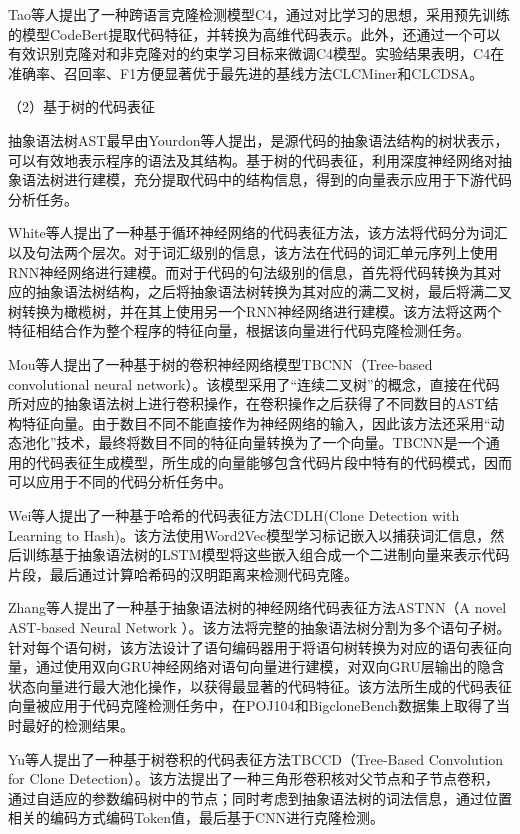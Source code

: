 Tao等人\cite{9796359}提出了一种跨语言克隆检测模型C4，通过对比学习的思想，采用预先训练的模型CodeBert提取代码特征，并转换为高维代码表示。此外，还通过一个可以有效识别克隆对和非克隆对的约束学习目标来微调C4模型。实验结果表明，C4在准确率、召回率、F1方便显著优于最先进的基线方法CLCMiner\cite{Cheng2017CLCMinerDC}和CLCDSA\cite{8952189}。

（2）基于树的代码表征

抽象语法树AST最早由Yourdon等人\cite{10.1145/1499949.1499997}提出，是源代码的抽象语法结构的树状表示，可以有效地表示程序的语法及其结构。基于树的代码表征，利用深度神经网络对抽象语法树进行建模，充分提取代码中的结构信息，得到的向量表示应用于下游代码分析任务。

White等人\cite{White2016DeepLC}提出了一种基于循环神经网络的代码表征方法，该方法将代码分为词汇以及句法两个层次。对于词汇级别的信息，该方法在代码的词汇单元序列上使用RNN神经网络进行建模。而对于代码的句法级别的信息，首先将代码转换为其对应的抽象语法树结构，之后将抽象语法树转换为其对应的满二叉树，最后将满二叉树转换为橄榄树，并在其上使用另一个RNN神经网络进行建模。该方法将这两个特征相结合作为整个程序的特征向量，根据该向量进行代码克隆检测任务。

Mou等人\cite{WOS:000485474201046}提出了一种基于树的卷积神经网络模型TBCNN（Tree-based convolutional neural network）。该模型采用了“连续二叉树”的概念，直接在代码所对应的抽象语法树上进行卷积操作，在卷积操作之后获得了不同数目的AST结构特征向量。由于数目不同不能直接作为神经网络的输入，因此该方法还采用“动态池化”技术，最终将数目不同的特征向量转换为了一个向量。TBCNN是一个通用的代码表征生成模型，所生成的向量能够包含代码片段中特有的代码模式，因而可以应用于不同的代码分析任务中。

Wei等人\cite{10.5555/3172077.3172312}提出了一种基于哈希的代码表征方法CDLH(Clone Detection with Learning to Hash)。该方法使用Word2Vec模型学习标记嵌入以捕获词汇信息，然后训练基于抽象语法树的LSTM模型将这些嵌入组合成一个二进制向量来表示代码片段，最后通过计算哈希码的汉明距离来检测代码克隆。

Zhang等人\cite{8812062}提出了一种基于抽象语法树的神经网络代码表征方法ASTNN（A novel AST-based Neural Network ）。该方法将完整的抽象语法树分割为多个语句子树。针对每个语句树，该方法设计了语句编码器用于将语句树转换为对应的语句表征向量，通过使用双向GRU神经网络对语句向量进行建模，对双向GRU层输出的隐含状态向量进行最大池化操作，以获得最显著的代码特征。该方法所生成的代码表征向量被应用于代码克隆检测任务中，在POJ104\cite{WOS:000485474201046}和BigcloneBench\cite{7332459}数据集上取得了当时最好的检测结果。

Yu等人\cite{8813290}提出了一种基于树卷积的代码表征方法TBCCD（Tree-Based Convolution for Clone Detection）。该方法提出了一种三角形卷积核对父节点和子节点卷积，通过自适应的参数编码树中的节点；同时考虑到抽象语法树的词法信息，通过位置相关的编码方式编码Token值，最后基于CNN进行克隆检测。

